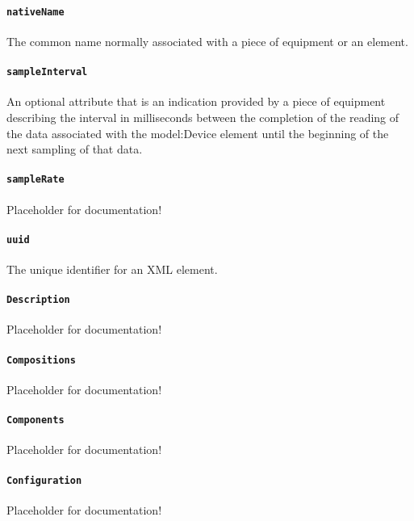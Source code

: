 \paragraph{\texttt{nativeName}}\mbox{}
\newline\tab The common name normally associated with a piece of equipment or an element.

\paragraph{\texttt{sampleInterval}}\mbox{}
\newline\tab An optional attribute that is an indication provided by a piece of equipment describing the interval in milliseconds between the completion of the reading of the data associated with the {model:Device} element until the beginning of the next sampling of that data.

\paragraph{\texttt{sampleRate}}\mbox{}
\newline\tab Placeholder for documentation!

\paragraph{\texttt{uuid}}\mbox{}
\newline\tab The unique identifier for an XML element.

\paragraph{\texttt{Description}}\mbox{}
\newline\tab Placeholder for documentation!

\paragraph{\texttt{Compositions}}\mbox{}
\newline\tab Placeholder for documentation!

\paragraph{\texttt{Components}}\mbox{}
\newline\tab Placeholder for documentation!

\paragraph{\texttt{Configuration}}\mbox{}
\newline\tab Placeholder for documentation!

